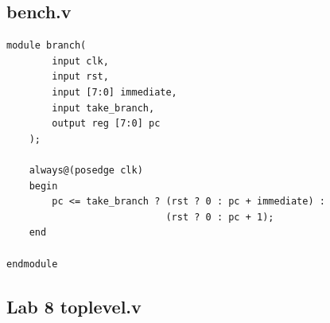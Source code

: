 \documentclass[12pt,a4paper]{article}
\begin{document}
\subsection*{bench.v}
\begin{lstlisting}
module branch(
        input clk,
        input rst,
        input [7:0] immediate,
        input take_branch,
        output reg [7:0] pc
    );

    always@(posedge clk)
    begin
        pc <= take_branch ? (rst ? 0 : pc + immediate) :
                            (rst ? 0 : pc + 1);
    end

endmodule
\end{lstlisting}


\subsection*{Lab 8 toplevel.v}
\end{document}
